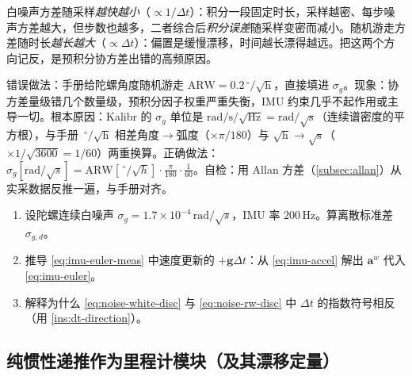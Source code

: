 \begin{insight}\label{ins:dt-direction}
白噪声方差随采样\emph{越快越小}（$\propto1/\Delta t$）：积分一段固定时长，采样越密、每步噪声方差越大，但步数也越多，二者综合后\emph{积分误差}随采样变密而减小。随机游走方差随时长\emph{越长越大}（$\propto\Delta t$）：偏置是缓慢漂移，时间越长漂得越远。把这两个方向记反，是预积分协方差出错的高频原因。
\end{insight}

\begin{pitfall}
错误做法：手册给陀螺角度随机游走 $\mathrm{ARW}=0.2\,^\circ/\sqrt{\mathrm h}$，直接填进 $\sigma_g$。现象：协方差量级错几个数量级，预积分因子权重严重失衡，IMU 约束几乎不起作用或主导一切。根本原因：Kalibr 的 $\sigma_g$ 单位是 $\mathrm{rad}/\mathrm s/\sqrt{\mathrm{Hz}}=\mathrm{rad}/\sqrt{\mathrm s}$（连续谱密度的平方根），与手册 $\,^\circ/\sqrt{\mathrm h}$ 相差角度$\to$弧度（$\times\pi/180$）与 $\sqrt{\mathrm h}\to\sqrt{\mathrm s}$（$\times1/\sqrt{3600}=1/60$）两重换算。正确做法：$\sigma_g[\mathrm{rad}/\sqrt s]=\mathrm{ARW}[\,^\circ/\sqrt h]\cdot\frac{\pi}{180}\cdot\frac{1}{60}$。自检：用 Allan 方差（\cref{subsec:allan}）从实采数据反推一遍，与手册对齐。
\end{pitfall}

\begin{practice}
\begin{enumerate}
  \item 设陀螺连续白噪声 $\sigma_g=1.7\times10^{-4}\,\mathrm{rad}/\sqrt s$，IMU 率 $200\,\mathrm{Hz}$。算离散标准差 $\sigma_{g,d}$。
  \item 推导 \cref{eq:imu-euler-meas} 中速度更新的 $+\mathbf g\Delta t$：从 \cref{eq:imu-accel} 解出 $\mathbf a^w$ 代入 \cref{eq:imu-euler}。
  \item 解释为什么 \cref{eq:noise-white-disc} 与 \cref{eq:noise-rw-disc} 中 $\Delta t$ 的指数符号相反（用 \cref{ins:dt-direction}）。
\end{enumerate}
\end{practice}

\subsection{纯惯性递推作为里程计模块（及其漂移定量）}
\label{subsec:imu-deadreckon}

